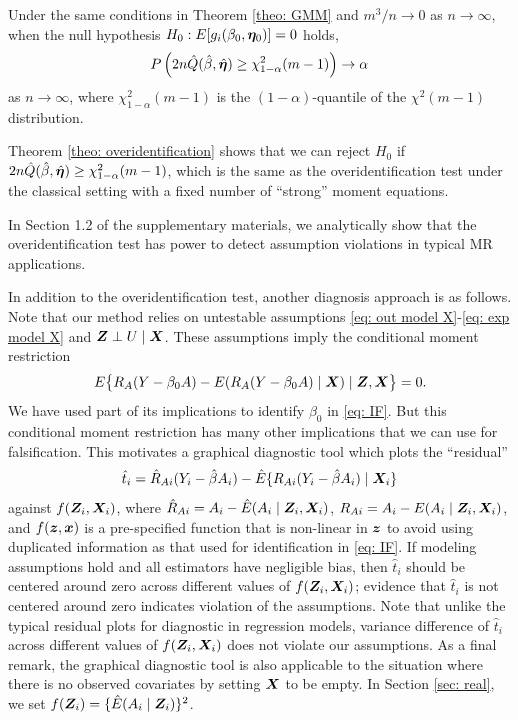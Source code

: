 \documentclass[12pt]{article}
\begin{document}
{{	\begin{theorem} \label{theo: overidentification}
		Under the same conditions in Theorem \ref{theo: GMM} and $m^3/n\to 0$  as $n\to\infty$, when the null hypothesis $H_0: E[g_i(\beta_0, \bm \eta_0)]=0$ holds, 	 
		$$ 
		P\left( 2n  \hat{Q} (\hat {{ \beta}}, \hat{\bm \eta}) \geq \chi_{1-\alpha}^2 (m-1) \right)  \rightarrow \alpha
		$$ 
		 as $n\to\infty$, where $\chi_{1-\alpha}^2 (m-1)$ is the $(1-\alpha)$-quantile of the $\chi^2 (m-1) $ distribution.  
	\end{theorem}
	Theorem \ref{theo: overidentification} shows that we can reject $H_0$ if $ 2n  \hat{Q} (\hat {{ \beta}}, \hat{\bm \eta}) \geq  \chi_{1-\alpha}^2 (m-1)$, which is the same as the overidentification test under the classical setting with a fixed number of ``strong'' moment equations.}  In Section 1.2 of the supplementary materials, we analytically show that the overidentification test has power to detect assumption violations in typical MR applications. 
	



In addition to the overidentification test, another diagnosis approach is as follows. Note that  our method relies on untestable assumptions \eqref{eq: out model X}-\eqref{eq: exp model X} and $\bm{Z} \perp U\mid \bm{X}$. These assumptions imply the conditional moment restriction 
\begin{align*}
	E\big\{R_A (Y- \beta_0 A) - E(R_A (Y- \beta_0 A) \mid \bm{X}) \mid \bm{Z}, \bm{X}\big\} = 0  .
\end{align*}
We have used part of its implications to identify $ \beta_0 $  in \eqref{eq: IF}. But this conditional moment restriction has many other implications that we can use for falsification. This motivates  a graphical diagnostic tool which plots  the ``residual'' 
\[
\hat t_i = \hat R_{Ai}(Y_i - \hat\beta A_i)- \hat E\{R_{Ai} (Y_i - \hat\beta A_i)\mid \bm{X}_i\} 
\]
against $f(\bm{Z}_i, \bm{X}_i)$, where $\hat R_{Ai}= A_i- \hat E(A_i \mid \bm{Z}_i, \bm{X}_i )$, $R_{Ai}= A_i- E(A_i \mid \bm{Z}_i, \bm{X}_i )$,  and $f(\bm{z}, \bm x)$ is a pre-specified function that is non-linear in $ \bm{z} $ to avoid using duplicated information as that used for identification in  \eqref{eq: IF}. If modeling assumptions hold and all estimators have negligible bias, then $\hat t_i$ should be centered around zero across different values of  $f(\bm{Z}_i, \bm{X}_i)$; evidence that $\hat t_i$ is not centered around zero indicates violation of the assumptions. Note that unlike the typical residual plots for diagnostic in regression models, variance difference of $ \hat t_i $ across different values of $f(\bm{Z}_i, \bm{X}_i)$ does not violate our assumptions. As a final remark, the graphical diagnostic tool is also applicable to the situation where there is no observed covariates by setting $\bm{X}$ to be empty. In Section \ref{sec: real}, we set $f(\bm{Z}_i)=\{ \hat E(A_i \mid \bm{Z}_i)\}^2$.









}
\end{document}
